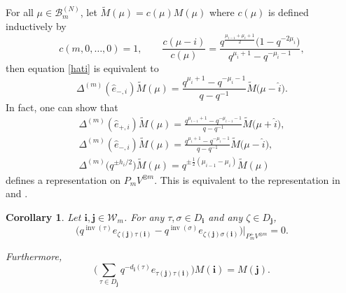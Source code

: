 \documentclass[11pt]{article}
\numberwithin{equation}{section}
\numberwithin{equation}{section}
\newtheorem{Corollary}[Theorem]{Corollary}
\DeclareMathOperator{\inv}{inv}
\newcommand{\ii}{{\mathbf{i}}}
\newcommand{\jj}{{\mathbf{j}}}
\begin{document}
\begin{Remark}\label{ExRep}
	For all $ \mu \in \mathcal{B}^{(N)}_m $, let $ \tilde{M}(\mu)=c(\mu)M(\mu) $ where $ c(\mu) $ is defined inductively by
	\begin{equation*}%
	c(m,0,\dots,0)=1, \qquad
	\frac{c(\mu-i)}{c(\mu)}=\frac{q^{\frac{\mu_{i-1}+\mu_i+1}{2}}\big(1-q^{-2\mu_i}\big)}{q^{\mu_i+1}-q^{-\mu_i-1}} ,
	\end{equation*} then equation \eqref{hati} is equivalent to
\begin{equation*}%
	\Delta^{(m)} (\hat{e}_{-,i}) \tilde{M}(\mu) =\frac{q^{\mu_i+1}-q^{-\mu_i-1}}{q-q^{-1}} \tilde{M}\big(\mu-\hat{i}\big).
	\end{equation*} In fact, one can show that
	\begin{gather*}
		\Delta^{(m)} (\hat{e}_{+,i}) \tilde{M}(\mu) =\frac{q^{\mu_{i-1}+1}-q^{-\mu_{i-1}-1}}{q-q^{-1}} \tilde{M}\big(\mu+\hat{i}\big),\\
		\Delta^{(m)} (\hat{e}_{-,i}) \tilde{M}(\mu) =\frac{q^{\mu_i+1}-q^{-\mu_i-1}}{q-q^{-1}} \tilde{M}\big(\mu-\hat{i}\big),\\
	 \Delta^{(m)} \big(q^{\pm h_i/2}\big) \tilde{M}(\mu) =q^{\pm\frac{1}{2}(\mu_{i-1}-\mu_i)} \tilde{M}(\mu)
	\end{gather*} defines a representation on $ P_mV^{\otimes m} $. This is equivalent to the representation in \cite[equation~(3)]{KMMO} and \cite[Lemma~3.1]{KIMRN}.
\end{Remark}
\begin{Corollary}\label{Core} Let $\ii,\jj\in\mathcal{W}_m$. For any $\tau,\sigma \in D_{\ii}$ and any $\zeta \in D_{\jj}$,
\[
\big(q^{\inv(\tau)}e_{\zeta(\jj) \tau(\ii)} - q^{\inv(\sigma)}e_{\zeta(\jj) \sigma(\ii)} \big) \big|_{P_{ m}^+V^{\otimes m} } =0.
\]
	
	Furthermore,
\[
\bigg( \sum_{\tau \in D_{\jj}} q^{-d_{\ii}(\tau)}e_{\tau(\jj)\tau(\ii)} \bigg) M(\ii) = M(\jj) .
\]
\end{Corollary}
\end{document}
